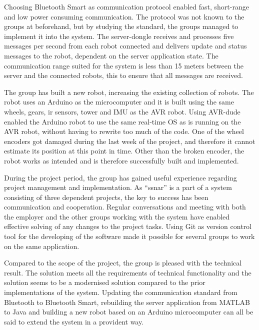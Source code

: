 Choosing Bluetooth Smart as communication protocol enabled fast, short-range and low power consuming communication. The protocol was not known to the groups at beforehand, but by studying the standard, the groups managed to implement it into the system. The server-dongle receives and processes five messages per second from each robot connected and delivers update and status messages to the robot, dependent on the server application state. The communication range suited for the system is less than 15 meters between the server and the connected robots, this to ensure that all messages are received.

The group has built a new robot, increasing the existing collection of robots. The robot uses an Arduino as the microcomputer and it is built using the same wheels, gears, \acrshort{ir} sensors, tower and IMU as the AVR robot. Using AVR-dude enabled the Arduino robot to use the same real-time OS as is running on the AVR robot, without having to rewrite too much of the code. One of the wheel encoders got damaged during the last week of the project, and therefore it cannot estimate its position at this point in time. Other than the broken encoder, the robot works as intended and is therefore successfully built and implemented.

During the project period, the group has gained useful experience regarding project management and implementation. As ``\acrfull{ssnar}'' is a part of a system consisting of three dependent projects, the key to success has been communication and cooperation. Regular conversations and meeting with both the employer and the other groups working with the system have enabled effective solving of any changes to the project tasks. Using Git as version control tool for the developing of the software made it possible for several groups to work on the same application.

Compared to the scope of the project, the group is pleased with the technical result. The solution meets all the requirements of technical functionality and the solution seems to be a modernised solution compared to the prior implementations of the system. Updating the communication standard from Bluetooth to Bluetooth Smart, rebuilding the server application from MATLAB to Java and building a new robot based on an Arduino microcomputer can all be said to extend the system in a provident way.